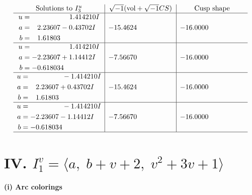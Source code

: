 \documentclass[1p]{elsarticle_modified}
\theoremstyle{definition}
\newcommand{\I}{\sqrt{-1}}
\begin{document}
$$\begin{array}{c|c|c}  
\text{Solutions to }I^u_{3}& \I (\text{vol} + \sqrt{-1}CS) & \text{Cusp shape}\\
 \hline 
\begin{aligned}
u &= \phantom{-0.000000 -}1.414210 I \\
a &= \phantom{-}2.23607 - 0.43702 I \\
b &= \phantom{-}1.61803\phantom{ +0.000000I}\end{aligned}
 & -15.4624\phantom{ +0.000000I} & -16.0000\phantom{ +0.000000I} \\ \hline\begin{aligned}
u &= \phantom{-0.000000 -}1.414210 I \\
a &= -2.23607 + 1.14412 I \\
b &= -0.618034\phantom{ +0.000000I}\end{aligned}
 & -7.56670\phantom{ +0.000000I} & -16.0000\phantom{ +0.000000I} \\ \hline\begin{aligned}
u &= \phantom{-0.000000 } -1.414210 I \\
a &= \phantom{-}2.23607 + 0.43702 I \\
b &= \phantom{-}1.61803\phantom{ +0.000000I}\end{aligned}
 & -15.4624\phantom{ +0.000000I} & -16.0000\phantom{ +0.000000I} \\ \hline\begin{aligned}
u &= \phantom{-0.000000 } -1.414210 I \\
a &= -2.23607 - 1.14412 I \\
b &= -0.618034\phantom{ +0.000000I}\end{aligned}
 & -7.56670\phantom{ +0.000000I} & -16.0000\phantom{ +0.000000I}\\
 \hline 
 \end{array}$$\newpage\newpage\renewcommand{\arraystretch}{1}
\centering \section*{IV. $I^v_{1}= \langle a,\;b+v+2,\;v^2+3 v+1 \rangle$}
\flushleft \textbf{(i) Arc colorings}\\
\end{document}
